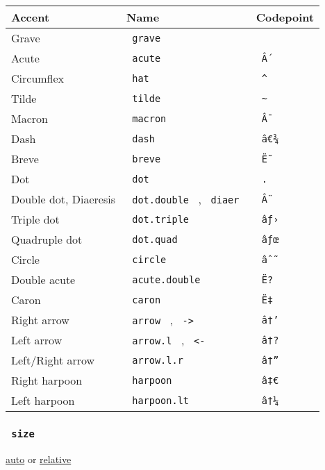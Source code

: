 \begin{longtable}[]{@{}lll@{}}
\toprule\noalign{}
Accent & Name & Codepoint \\
\midrule\noalign{}
\endhead
\bottomrule\noalign{}
\endlastfoot
Grave & \texttt{\ grave\ } & \texttt{\ \textasciigrave{}\ } \\
Acute & \texttt{\ acute\ } & \texttt{\ Â´\ } \\
Circumflex & \texttt{\ hat\ } & \texttt{\ \^{}\ } \\
Tilde & \texttt{\ tilde\ } & \texttt{\ \textasciitilde{}\ } \\
Macron & \texttt{\ macron\ } & \texttt{\ Â¯\ } \\
Dash & \texttt{\ dash\ } & \texttt{\ â€¾\ } \\
Breve & \texttt{\ breve\ } & \texttt{\ Ë˜\ } \\
Dot & \texttt{\ dot\ } & \texttt{\ .\ } \\
Double dot, Diaeresis & \texttt{\ dot.double\ } , \texttt{\ diaer\ } &
\texttt{\ Â¨\ } \\
Triple dot & \texttt{\ dot.triple\ } & \texttt{\ âƒ›\ } \\
Quadruple dot & \texttt{\ dot.quad\ } & \texttt{\ âƒœ\ } \\
Circle & \texttt{\ circle\ } & \texttt{\ âˆ˜\ } \\
Double acute & \texttt{\ acute.double\ } & \texttt{\ Ë?\ } \\
Caron & \texttt{\ caron\ } & \texttt{\ Ë‡\ } \\
Right arrow & \texttt{\ arrow\ } , \texttt{\ -\textgreater{}\ } &
\texttt{\ â†’\ } \\
Left arrow & \texttt{\ arrow.l\ } , \texttt{\ \textless{}-\ } &
\texttt{\ â†?\ } \\
Left/Right arrow & \texttt{\ arrow.l.r\ } & \texttt{\ â†”\ } \\
Right harpoon & \texttt{\ harpoon\ } & \texttt{\ â‡€\ } \\
Left harpoon & \texttt{\ harpoon.lt\ } & \texttt{\ â†¼\ } \\
\end{longtable}

\subsubsection{\texorpdfstring{\texttt{\ size\ }}{ size }}\label{parameters-size}

\href{/docs/reference/foundations/auto/}{auto} {or}
\href{/docs/reference/layout/relative/}{relative}

